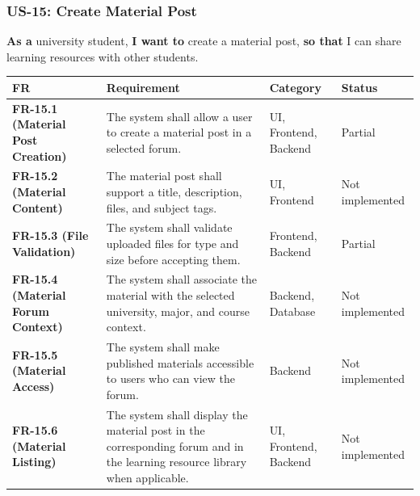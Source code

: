 \documentclass[12pt]{article}
\renewcommand{\baselinestretch}{1.5}
\begin{document}
\hypertarget{sec:us-15-create-material-post}{}
\subsubsection*{US-15: Create Material Post}
\par\medskip

\textbf{As a} university student, \textbf{I want to} create a material post, \textbf{so that} I can share learning resources with other students.
\par\medskip

\begingroup
\small
\renewcommand{\baselinestretch}{1.0}\selectfont
\renewcommand{\arraystretch}{1.15}
\setlength{\tabcolsep}{6pt}
\begin{longtable}{|>{\raggedright\arraybackslash}p{}|>{\raggedright\arraybackslash}p{}|>{\raggedright\arraybackslash}p{}|>{\raggedright\arraybackslash}p{}|}
\hline
\textbf{FR} & \textbf{Requirement} & \textbf{Category} & \textbf{Status} \\ \hline
\endhead
\textbf{FR-15.1 (Material Post Creation)} & The system shall allow a user to create a material post in a selected forum. & UI, Frontend, Backend & Partial \\ \hline
\textbf{FR-15.2 (Material Content)} & The material post shall support a title, description, files, and subject tags. & UI, Frontend & Not implemented \\ \hline
\textbf{FR-15.3 (File Validation)} & The system shall validate uploaded files for type and size before accepting them. & Frontend, Backend & Partial \\ \hline
\textbf{FR-15.4 (Material Forum Context)} & The system shall associate the material with the selected university, major, and course context. & Backend, Database & Not implemented \\ \hline
\textbf{FR-15.5 (Material Access)} & The system shall make published materials accessible to users who can view the forum. & Backend & Not implemented \\ \hline
\textbf{FR-15.6 (Material Listing)} & The system shall display the material post in the corresponding forum and in the learning resource library when applicable. & UI, Frontend, Backend & Not implemented \\ \hline
\end{longtable}
\endgroup
\par\medskip
\end{document}
